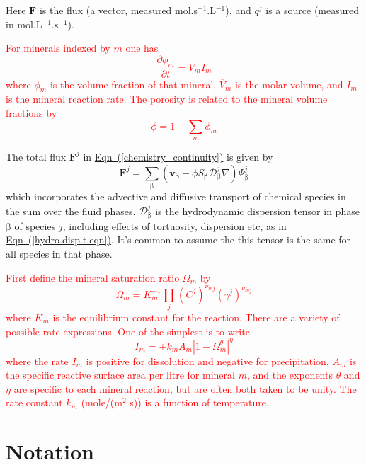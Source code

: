 \documentclass[12pt]{report}
\def\phase{\mathrm{\beta}}
\def\flux{\mathbf{F}}
\def\darcyvel{\mathbf{v}}
\begin{document}
Here $\flux$ is the flux (a vector, measured
mol.s$^{-1}$.L$^{-1}$), and $q^{j}$ is a source (measured in
mol.L$^{-1}$.s$^{-1}$).

\textcolor{red}{
For minerals indexed by $m$ one has
\begin{equation}
  \frac{\partial \phi_{m}}{\partial t} = \overline{V}_{m} I_{m}
\end{equation}
where $\phi_{m}$ is the volume fraction of that mineral,
$\overline{V}_{m}$ is the molar volume, and $I_{m}$ is the mineral
reaction rate. The porosity is related to the mineral volume fractions
by
\begin{equation}
  \phi=1-\sum_{m} \phi_{m}
\end{equation}
}

The total flux $\flux^{j}$ in
\hyperref[chemistry_continuity]{Eqn~(\ref*{chemistry_continuity})} is
given by
\begin{equation}
  \flux^{j}=\sum_{\phase} (\darcyvel_{\phase} - \phi S_{\phase} {\mathcal{D}}_{\phase}^{j} \nabla) \Psi_{\phase}^{j}
\end{equation}
which incorporates the advective and diffusive transport of chemical
species in the sum over the fluid phases. ${\mathcal{D}}_{\phase}^{j}$
is the hydrodynamic dispersion tensor in phase $\phase$ of species
$j$, including effects of tortuosity, dispersion etc, as in
\hyperref[hydro.disp.t.eqn]{Eqn~(\ref*{hydro.disp.t.eqn})}. It's
common to assume the this tensor is the same for all species in that
phase.

\textcolor{red}{
First define the mineral saturation ratio $\Omega_{m}$ by
\begin{equation}
  \Omega_{m}=K_{m}^{-1} \prod_{j} (C^{j})^{\nu_{mj}} (\gamma^{j})^{\nu_{mj}}
\end{equation}
where $K_{m}$ is the equilibrium constant for the reaction. There are
a variety of possible rate expressions. One of the simplest is to
write
\begin{equation}
  I_{m} = \pm k_{m} A_{m} |1-\Omega_{m}^{\theta}|^{\eta}
\end{equation}
where the rate $I_{m}$ is positive for dissolution and negative for
precipitation, $A_{m}$ is the specific reactive surface area per litre
for mineral $m$, and the exponents $\theta$ and $\eta$ are specific to
each mineral reaction, but are often both taken to be unity. The rate
constant $k_{m}$ (mole/(m$^{2}$ s)) is a function of temperature.  }

\section{Notation}
\label{ssec.notation}
\end{document}
